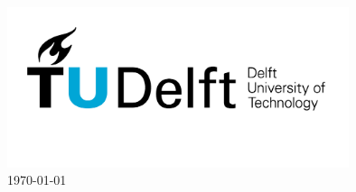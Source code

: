 \begin{titlepage}
\includegraphics[width=100mm]{logo.jpg}\\[1cm] %


{\large \today}\\[3cm] %

\vfill %

\end{titlepage}